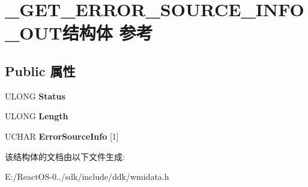 \hypertarget{struct___g_e_t___e_r_r_o_r___s_o_u_r_c_e___i_n_f_o___o_u_t}{}\section{\+\_\+\+G\+E\+T\+\_\+\+E\+R\+R\+O\+R\+\_\+\+S\+O\+U\+R\+C\+E\+\_\+\+I\+N\+F\+O\+\_\+\+O\+U\+T结构体 参考}
\label{struct___g_e_t___e_r_r_o_r___s_o_u_r_c_e___i_n_f_o___o_u_t}
\subsection*{Public 属性}
\begin{DoxyCompactItemize}
\item 
\mbox{\label{struct___g_e_t___e_r_r_o_r___s_o_u_r_c_e___i_n_f_o___o_u_t_a47f7d72c3a7642c2b7a1b5e086b92587}} 
U\+L\+O\+NG {\bfseries Status}
\item 
\mbox{\label{struct___g_e_t___e_r_r_o_r___s_o_u_r_c_e___i_n_f_o___o_u_t_a1d3dc75d2fec9af1f52ce09cb86e8b13}} 
U\+L\+O\+NG {\bfseries Length}
\item 
\mbox{\label{struct___g_e_t___e_r_r_o_r___s_o_u_r_c_e___i_n_f_o___o_u_t_a5e7a4c1ba9f5a26c27500b69a6b94a6b}} 
U\+C\+H\+AR {\bfseries Error\+Source\+Info} \mbox{[}1\mbox{]}
\end{DoxyCompactItemize}


该结构体的文档由以下文件生成\+:\begin{DoxyCompactItemize}
\item 
E\+:/\+React\+O\+S-\/0../sdk/include/ddk/wmidata.\+h\end{DoxyCompactItemize}
